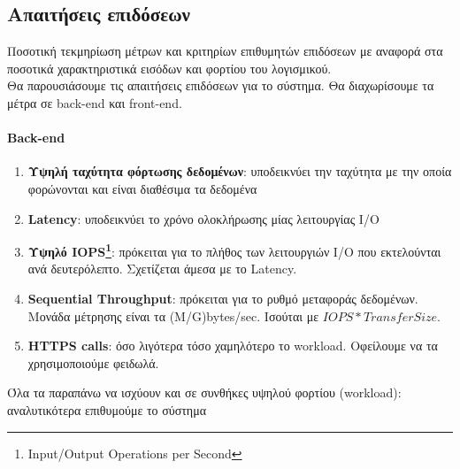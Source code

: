 \subsection{Απαιτήσεις επιδόσεων}
Ποσοτική τεκμηρίωση μέτρων και κριτηρίων επιθυμητών επιδόσεων με αναφορά στα ποσοτικά
χαρακτηριστικά εισόδων και φορτίου του λογισμικού.
\hfill\\
Θα παρουσιάσουμε τις απαιτήσεις επιδόσεων για το σύστημα. Θα διαχωρίσουμε τα μέτρα σε back-end και front-end.
\paragraph*{Back-end}
\begin{enumerate}
	\item \textbf{Υψηλή ταχύτητα φόρτωσης δεδομένων}: υποδεικνύει την ταχύτητα με την οποία φορώνονται και είναι διαθέσιμα τα δεδομένα
	\item \textbf{Latency}: υποδεικνύει το χρόνο ολοκλήρωσης μίας λειτουργίας I/O
	\item \textbf{Υψηλό IOPS\footnote{Input/Output Operations per Second}}: πρόκειται για το πλήθος των λειτουργιών I/O που εκτελούνται ανά δευτερόλεπτο. Σχετίζεται άμεσα με το Latency.
	\item \textbf{Sequential Throughput}: πρόκειται για το ρυθμό μεταφοράς δεδομένων. Μονάδα μέτρησης είναι τα (M/G)bytes/sec. Ισούται με  $IOPS*TransferSize$.
	\item \textbf{HTTPS calls}: όσο λιγότερα τόσο χαμηλότερο το workload. Οφείλουμε να τα χρησιμοποιούμε φειδωλά.
\end{enumerate} 
Όλα τα παραπάνω να ισχύουν και σε συνθήκες υψηλού φορτίου (workload): αναλυτικότερα επιθυμούμε το σύστημα 

